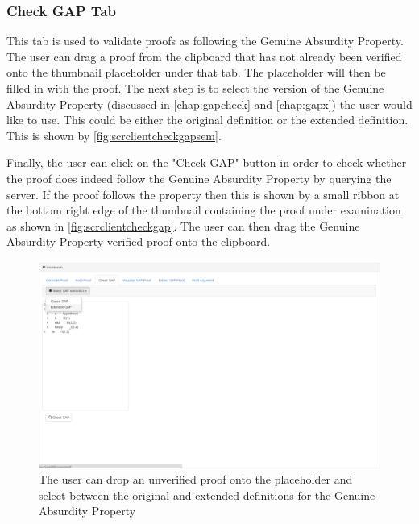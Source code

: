 \documentclass[11pt,twoside,a4paper]{report}
\begin{document}
\subsubsection{Check GAP Tab}
This tab is used to validate proofs as following the Genuine Absurdity Property. The user can drag a proof from the clipboard that has not already been verified onto the thumbnail placeholder under that tab. The placeholder will then be filled in with the proof. The next step is to select the version of the Genuine Absurdity Property (discussed in \autoref{chap:gapcheck} and \autoref{chap:gapx}) the user would like to use. This could be either the original definition or the extended definition. This is shown by \autoref{fig:scrclientcheckgapsem}. 

Finally, the user can click on the "Check GAP" button in order to check whether the proof does indeed follow the Genuine Absurdity Property by querying the server. If the proof follows the property then this is shown by a small ribbon at the bottom right edge of the thumbnail containing the proof under examination as shown in \autoref{fig:scrclientcheckgap}. The user can then drag the Genuine Absurdity Property-verified proof onto the clipboard.

\begin{figure}[htp]
\centerline{\includegraphics[scale=0.3]{img/scr-client-checkgapsem.png}}
\caption{The user can drop an unverified proof onto the placeholder and select between the original and extended definitions for the Genuine Absurdity Property\label{fig:scrclientcheckgapsem}}
\end{figure}
\end{document}
